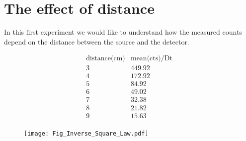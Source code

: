 \section{The effect of distance}


In this first experiment we would like to understand how the measured counts depend on the distance between the source and the detector.

\begin{displaymath}
\begin{array}{cc}
 \text{distance(cm)} & \text{mean(cts)/Dt} 
   \\
3  &  449.92   \\
4  &  172.92   \\
5  &  84.92    \\
6  &  49.02    \\
7  &  32.38    \\
8  &  21.82    \\
9  &  15.63    \\
\end{array}
\end{displaymath}

\begin{figure}
  \texttt{[image: Fig\_Inverse\_Square\_Law.pdf]}
\end{figure}



